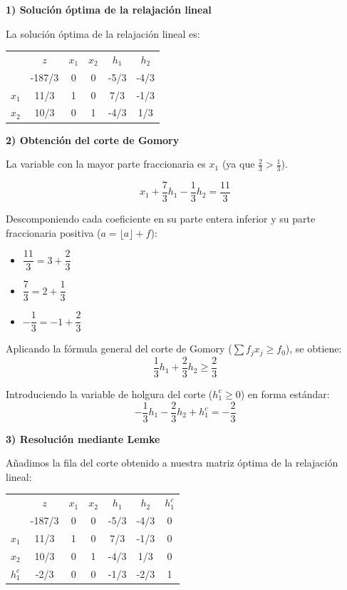 





\textbf{1) Solución óptima de la relajación lineal }

La solución óptima de la relajación lineal es:

\begin{center}
\begin{tabular}{c|c|cccc|}
 & $z$ & $x_1$ & $x_2$ &  $h_1$ & $h_2$ \\ 
 & -187/3 & $0$ & 0  & -5/3 & -4/3 \\ 
\hline
$x_1$ & 11/3  & 1 & 0 & 7/3 & -1/3\\ 
$x_2$ & 10/3  & 0 & 1 & -4/3 & 1/3\\ 
\hline
\end{tabular}
\end{center}

\textbf{2) Obtención del corte de Gomory}

La variable con la mayor parte fraccionaria es \textbf{$x_1$} (ya que $\frac{2}{3} > \frac{1}{3}$). 

\[
x_1 + \frac{7}{3}h_1 - \frac{1}{3}h_2 = \frac{11}{3}
\]

Descomponiendo cada coeficiente en su parte entera inferior y su parte fraccionaria positiva ($a = \lfloor a \rfloor + f$):
\begin{itemize}
    \item $\dfrac{11}{3} = 3 + \dfrac{2}{3}$
    \item $\dfrac{7}{3} = 2 + \dfrac{1}{3}$
    \item $-\dfrac{1}{3} = -1 + \dfrac{2}{3}$
\end{itemize}

Aplicando la fórmula general del corte de Gomory ($\sum f_j x_j \ge f_0$), se obtiene:
\[
\frac{1}{3}h_1 + \frac{2}{3}h_2 \ge \frac{2}{3}
\]

Introduciendo la variable de holgura del corte ($h^c_1 \ge 0$) en forma estándar:
\[
-\frac{1}{3}h_1 - \frac{2}{3}h_2 + h^c_1 = -\frac{2}{3}
\]

\textbf{3) Resolución mediante Lemke}

Añadimos la fila del corte obtenido a nuestra matriz óptima de la relajación lineal:


\begin{center}
\begin{tabular}{c|c|ccccc|}
 & $z$ & $x_1$ & $x_2$ &  $h_1$ & $h_2$ &$h^c_1$\\ 
 & -187/3 & $0$ & 0  & -5/3 & -4/3 &0\\ 
\hline
$x_1$ & 11/3  & 1 & 0 & 7/3 & -1/3&0\\ 
$x_2$ & 10/3  & 0 & 1 & -4/3 & 1/3 &0 \\ 
$h^c_1$ & -2/3  & 0 & 0 & -1/3 & -2/3 & 1\\ 

\hline
\end{tabular}
\end{center}



